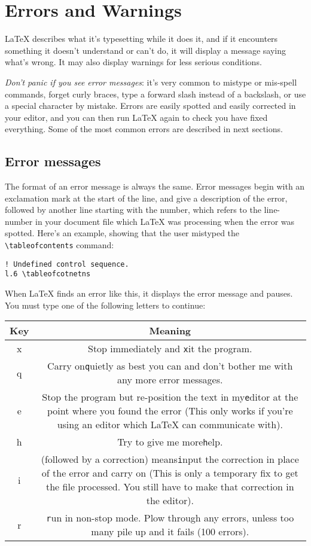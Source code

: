 \section{Errors and Warnings}
LaTeX describes what it's typesetting while it does it, and if it encounters
something it doesn't understand or can't do, it will display a message saying
what's wrong. It may also display warnings for less serious conditions.

\textit{Don't panic if you see error messages}: it's very common to mistype or
mis-spell commands, forget curly braces, type a forward slash instead of a
backslash, or use a special character by mistake. Errors are easily spotted and
easily corrected in your editor, and you can then run LaTeX again to check you
have fixed everything. Some of the most common errors are described in next
sections.

\subsection{Error messages} The format of an error message is always the same.
Error messages begin with an exclamation mark at the start of the line, and
give a description of the error, followed by another line starting with the
number, which refers to the line-number in your document file which LaTeX was
processing when the error was spotted. Here's an example, showing that the user
mistyped the \verb|\tableofcontents|
command:


\begin{verbatim}
! Undefined control sequence.
l.6 \tableofcotnetns

\end{verbatim}

When LaTeX finds an error like this, it displays the error message and pauses. You must type one of the following letters to
continue:

\begin{tabular}{c c} \hline
Key 
& Meaning
\\ \hline
x
& Stop immediately and \texttt{x}it the program.
\\ \hline
q
& Carry on\texttt{q}uietly as best you can and don't bother me with any more error messages.
\\ \hline
e
& Stop the program but re-position the text in my\texttt{e}ditor at the point where you found the error (This only works if you're using an editor which LaTeX can communicate with).
\\ \hline
h
& Try to give me more\texttt{h}elp.
\\ \hline
i
& (followed by a correction) means\texttt{i}nput the correction in place of the error and carry on (This is only a temporary fix to get the file processed. You still have to make that correction in the editor).
\\ \hline
r
&\texttt{r}un in non-stop mode. Plow through any errors, unless too many pile up and it fails (100 errors).
\\ \hline
\end{tabular}


